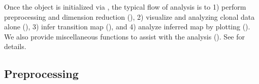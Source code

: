 \documentclass[letterpaper,10pt,english]{sphinxmanual}
\begin{document}
Once the  object is initialized via , the typical flow of analysis is to 1) perform preprocessing and dimension reduction (), 2) visualize and analyzing clonal data alone (), 3) infer transition map (), and 4) analyze inferred map by plotting (). We also provide miscellaneous functions to assist with the analysis (). See {\hyperref[\detokenize{getting_started::doc}]{}} for details.


\subsection{Preprocessing}
\label{\detokenize{api:preprocessing}}
\end{document}
